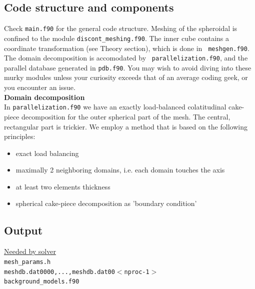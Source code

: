 \documentclass[11pt,letter,fleqn,english,notitlepage]{article}
\begin{document}
\subsection{Code structure and components}
Check {\tt main.f90} for the general code structure. Meshing of the spheroidal
is confined to the module {\tt discont\_meshing.f90}. The inner cube contains a
coordinate transformation (see Theory section), which is done in {\tt
meshgen.f90}. The domain decomposition is accomodated by {\tt
parallelization.f90}, and the parallel database generated in {\tt pdb.f90}. You
may wish to avoid diving into these murky modules unless your curiosity exceeds
that of an average coding geek, or you encounter an issue.\\

\noindent\textbf{Domain decomposition }\\
In {\tt parallelization.f90} we have an exactly load-balanced colatitudinal
cake-piece decomposition for the outer spherical part of the mesh. The central,
rectangular part is trickier. We employ a method that is based on the
following principles:

\begin{itemize}
    \item exact load balancing 
    \item maximally 2 neighboring domains, i.e. each domain touches the axis
    \item at least two elements thickness
    \item spherical cake-piece decomposition as 'boundary condition'
\end{itemize}



\subsection{Output}
\underline{Needed by solver} \\
{\tt mesh\_params.h}\\
{\tt meshdb.dat0000,...,meshdb.dat00$<$nproc-1$>$}\\
{\tt background\_models.f90}\\
\end{document}
